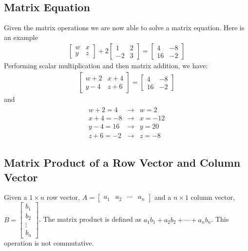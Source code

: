 \documentclass[14pt]{extarticle}
\begin{document}
\subsection{Matrix Equation}
Given the matrix operations we are now able to solve a matrix equation. Here is an example
\begin{align*}
	\begin{bmatrix}
		w & x \\
		y & z
	\end{bmatrix}
	+ 2\begin{bmatrix}
		1 & 2 \\
		-2 & 3
	\end{bmatrix}
	= \begin{bmatrix}
		4 & -8 \\
		16 & -2
	\end{bmatrix}
\end{align*}
Performing scalar multiplication and then matrix addition, we have:
\begin{align*}
	\begin{bmatrix}
		w+2 & x+4 \\
		y-4 & z+6
	\end{bmatrix}
	= \begin{bmatrix}
		4 & -8 \\
		16 & -2
	\end{bmatrix}
\end{align*}
and
\begin{align*}
	\begin{array}{lcl}
		w+2=4 & \to & w=2 \\
		x+4=-8 & \to & x=-12 \\
		y-4=16 & \to & y=20 \\
		z+6=-2 & \to & z=-8
	\end{array}
\end{align*}

\subsection{Matrix Product of a Row Vector and Column Vector}
Given a $1\times n$ row vector, $A=\begin{bmatrix}a_1 & a_2 & \cdots & a_n\end{bmatrix}$ and a $n\times 1$ column vector, $B=\begin{bmatrix}b_1 \\ b_2 \\ \vdots \\ b_n\end{bmatrix}$. The matrix product is defined as $a_1b_1 + a_2b_2 + \cdots + a_nb_n$. This operation is not commutative.
\end{document}
